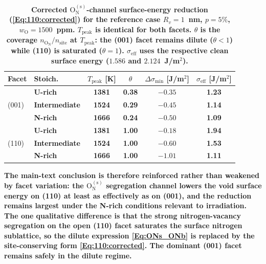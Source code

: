\documentclass[preprint,12pt,sort&compress]{elsarticle}
\newcommand{\?}{\stackrel{?}{=}}
\providecommand{\DIFaddtex}[1]{{\bf #1}} %
\providecommand{\DIFaddFL}[1]{\DIFadd{#1}} %
\providecommand{\DIFadd}[1]{\texorpdfstring{\DIFaddtex{#1}}{#1}} %
\begin{document}
\begin{table}[h!]
\centering
\footnotesize
\caption{\DIFaddFL{Corrected $\text{O}_\text{N}^{(\text{s})}$-channel surface-energy
reduction (\cref{Eq:110:corrected}) for the reference case $R_v=1$~nm, $p=5\%$,
$w_\text{O}=1500$~ppm. $T_\text{peak}$ is identical for both facets. $\theta$ is
the coverage $n_{\text{O}_\text{N}}/n_\text{site}$ at $T_\text{peak}$: the (001)
facet remains dilute ($\theta<1$) while (110) is saturated ($\theta=1$).
$\sigma_\text{eff}$ uses the respective clean surface energy ($1.586$ and
$2.124$~J/m$^2$).}}
\begin{tabular}{llcccc}
\hline
\DIFaddFL{Facet }& \DIFaddFL{Stoich. }& \DIFaddFL{$T_\text{peak}$ }[\DIFaddFL{K}] & \DIFaddFL{$\theta$ }&
\DIFaddFL{$\Delta\sigma_\text{min}$ }[\DIFaddFL{J/m$^2$}] & \DIFaddFL{$\sigma_\text{eff}$ }[\DIFaddFL{J/m$^2$}] \\
\hline
\multirow{3}{*}{(001)}
 & \DIFaddFL{U-rich       }& \DIFaddFL{1381 }& \DIFaddFL{0.38 }& \DIFaddFL{$-0.35$ }& \DIFaddFL{1.23 }\\
 & \DIFaddFL{Intermediate }& \DIFaddFL{1524 }& \DIFaddFL{0.29 }& \DIFaddFL{$-0.45$ }& \DIFaddFL{1.14 }\\
 & \DIFaddFL{N-rich       }& \DIFaddFL{1666 }& \DIFaddFL{0.24 }& \DIFaddFL{$-0.50$ }& \DIFaddFL{1.09 }\\
\hline
\multirow{3}{*}{(110)}
 & \DIFaddFL{U-rich       }& \DIFaddFL{1381 }& \DIFaddFL{1.00 }& \DIFaddFL{$-0.18$ }& \DIFaddFL{1.94 }\\
 & \DIFaddFL{Intermediate }& \DIFaddFL{1524 }& \DIFaddFL{1.00 }& \DIFaddFL{$-0.60$ }& \DIFaddFL{1.53 }\\
 & \DIFaddFL{N-rich       }& \DIFaddFL{1666 }& \DIFaddFL{1.00 }& \DIFaddFL{$-1.01$ }& \DIFaddFL{1.11 }\\
\hline
\end{tabular}
\label{Tab:110:results}
\end{table}

\DIFadd{The main-text conclusion is therefore reinforced rather than weakened by facet variation: the $\text{O}_\text{N}^{(\text{s})}$ segregation channel lowers the void surface energy on (110) at least as effectively as on (001), and the reduction remains largest under the N-rich conditions relevant to irradiation. The one qualitative difference is that the strong nitrogen-vacancy segregation on the open (110) facet saturates the surface nitrogen sublattice, so the dilute expression \cref{Eq:ONs_ONb} is replaced by the site-conserving form \cref{Eq:110:corrected}. The dominant (001) facet remains safely in the dilute regime.
}
\end{document}

